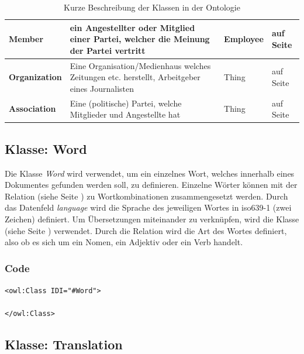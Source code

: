 ﻿\documentclass[
    11pt,
    latin1,
    a4paper,
    oneside
]{scrreprt}
\begin{document}
\begin{table}[h]
\begin{tabular}{ | l | p{5cm} | l | l| }
		\textbf{Member} & ein Angestellter oder Mitglied einer Partei, welcher die Meinung der Partei vertritt & Employee & \nameref{sec:class_member} auf Seite \pageref{sec:class_member} \\ \hline
		\textbf{Organization} & Eine Organisation/Medienhaus welches Zeitungen etc. herstellt, Arbeitgeber eines Journalisten & Thing & \nameref{sec:class_organization} auf Seite \pageref{sec:class_organization} \\ \hline
		\textbf{Association} & Eine (politische) Partei, welche Mitglieder und Angestellte hat & Thing & \nameref{sec:class_association} auf Seite \pageref{sec:class_association} \\ \hline
	\end{tabular}
	\caption{Kurze Beschreibung der Klassen in der Ontologie}
	\label{tbl:classes}
\end{table}


\subsection{Klasse: Word} \label{sec:class_word}

Die Klasse \emph{Word} wird verwendet, um ein einzelnes Wort, welches innerhalb eines Dokumentes gefunden werden soll, zu definieren. Einzelne W\"orter k\"onnen mit der Relation  (siehe Seite \pageref{sec:rel_wordcombo}) zu Wortkombinationen zusammengesetzt werden. Durch das Datenfeld \emph{language} wird die Sprache des jeweiligen Wortes in iso639-1 (zwei Zeichen) definiert. Um \"Ubersetzungen miteinander zu verknüpfen, wird die Klasse  (siehe Seite \pageref{sec:class_translation}) verwendet. Durch die Relation  wird die Art des Wortes definiert, also ob es sich um ein Nomen, ein Adjektiv oder ein Verb handelt.

\subsubsection{Code}  \label{sec:class_word_code}

\texttt{<owl:Class IDI="#Word"> \\
	\\
</owl:Class> }

\subsection{Klasse: Translation} \label{sec:class_translation}
\end{document}
